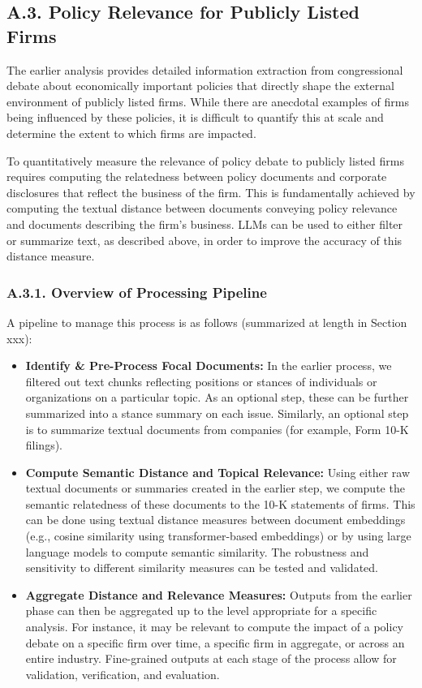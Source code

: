 \documentclass[11pt]{article}
\begin{document}
\subsection*{A.3. Policy Relevance for Publicly Listed Firms}

The earlier analysis provides detailed information extraction from congressional debate about economically important policies that directly shape the external environment of publicly listed firms. While there are anecdotal examples of firms being influenced by these policies, it is difficult to quantify this at scale and determine the extent to which firms are impacted.

To quantitatively measure the relevance of policy debate to publicly listed firms requires computing the relatedness between policy documents and corporate disclosures that reflect the business of the firm. This is fundamentally achieved by computing the textual distance between documents conveying policy relevance and documents describing the firm's business. LLMs can be used to either filter or summarize text, as described above, in order to improve the accuracy of this distance measure.

\subsubsection*{A.3.1. Overview of Processing Pipeline}

A pipeline to manage this process is as follows (summarized at length in Section xxx):

\begin{itemize}
    \item \textbf{Identify \& Pre-Process Focal Documents:} In the earlier process, we filtered out text chunks reflecting positions or stances of individuals or organizations on a particular topic. As an optional step, these can be further summarized into a stance summary on each issue. Similarly, an optional step is to summarize textual documents from companies (for example, Form 10-K filings).
    \item \textbf{Compute Semantic Distance and Topical Relevance:} Using either raw textual documents or summaries created in the earlier step, we compute the semantic relatedness of these documents to the 10-K statements of firms. This can be done using textual distance measures between document embeddings (e.g., cosine similarity using transformer-based embeddings) or by using large language models to compute semantic similarity. The robustness and sensitivity to different similarity measures can be tested and validated.
    \item \textbf{Aggregate Distance and Relevance Measures:} Outputs from the earlier phase can then be aggregated up to the level appropriate for a specific analysis. For instance, it may be relevant to compute the impact of a policy debate on a specific firm over time, a specific firm in aggregate, or across an entire industry. Fine-grained outputs at each stage of the process allow for validation, verification, and evaluation.
\end{itemize}
\end{document}
